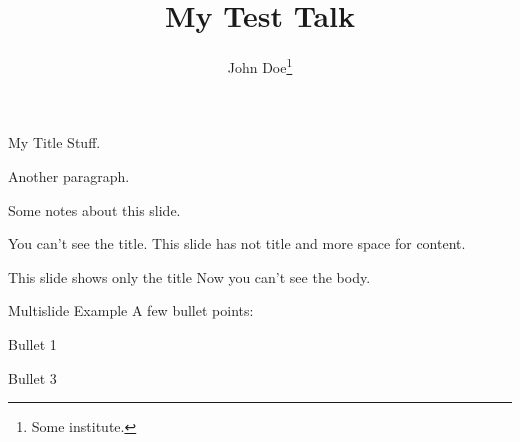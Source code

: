 \documentclass[12pt,screen]{talk}
\title{My Test Talk}
\author[John Doe]{John Doe\thanks{Some institute.}}
\begin{document}
\maketitleslide

\begin{slide}{My Title}
  Stuff.

  Another paragraph.
\end{slide}

\begin{notes}
  Some notes about this slide.
\end{notes}

\begin{slide}[notitle]{You can't see the title.}
  This slide has not title and more space for content.
\end{slide}

\begin{slide}[onlytitle]{This slide shows only the title}
  Now you can't see the body.
\end{slide}

\begin{multislide}{3}{Multislide Example}
  A few bullet points:
  \begin{itemize}
  \item Bullet 1
  {\item Bullet 3}
  \end{itemize}
\end{multislide}
\end{document}
